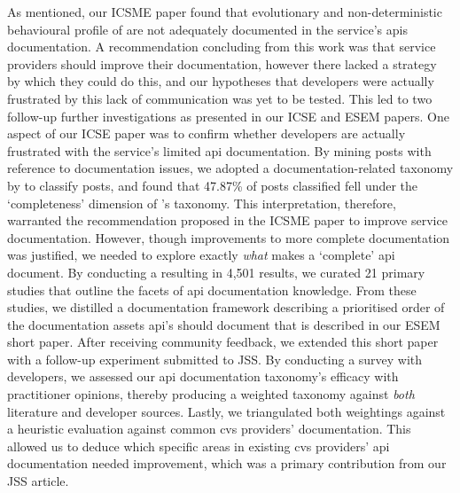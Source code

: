As mentioned, our ICSME paper found that evolutionary and non-deterministic behavioural profile of are not adequately documented in the service's \glspl{api} documentation. A recommendation concluding from this work was that service providers should improve their documentation, however there lacked a strategy by which they could do this, and our hypotheses that developers were actually frustrated by this lack of communication was yet to be tested. This led to two follow-up further investigations as presented in our ICSE and ESEM papers. One aspect of our ICSE paper was to confirm whether developers are actually frustrated with the service's limited \gls{api} documentation. By mining  posts with reference to documentation issues, we adopted a \citeyear{Aghajani:2019bo} documentation-related taxonomy by \citet{Aghajani:2018et} to classify posts, and found that 47.87\% of posts classified fell under the `completeness' dimension of \citeauthor{Aghajani:2018et}'s taxonomy. This interpretation, therefore, warranted the recommendation proposed in the ICSME paper to improve service documentation. However, though improvements to more complete documentation was justified, we needed to explore exactly \textit{what} makes a `complete' \gls{api} document. By conducting a  resulting in 4,501 results, we curated 21 primary studies that outline the facets of \gls{api} documentation knowledge. From these studies, we distilled a documentation framework describing a prioritised order of the documentation assets \gls{api}'s should document that is described in our ESEM short paper. After receiving community feedback, we extended this short paper with a follow-up experiment submitted to JSS. By conducting a survey with developers, we assessed our \gls{api} documentation taxonomy's efficacy with practitioner opinions, thereby producing a weighted taxonomy against \textit{both} literature and developer sources. Lastly, we triangulated both weightings against a heuristic evaluation against common \gls{cvs} providers' documentation. This allowed us to deduce which specific areas in existing \gls{cvs} providers' \gls{api} documentation needed improvement, which was a primary contribution from our JSS article.

